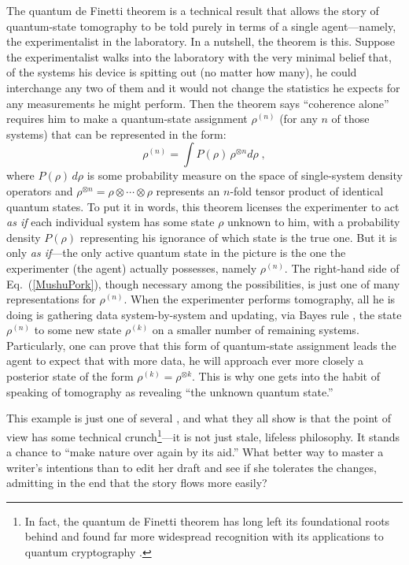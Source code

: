 The quantum de Finetti theorem is a technical result that allows the story of quantum-state tomography to be told purely in terms of a single agent---namely, the experimentalist in the laboratory.  In a nutshell, the theorem is this.  Suppose the experimentalist walks into the laboratory with the very minimal belief that, of the systems his device is spitting out (no matter how many), he could interchange any two of them and it would not change the statistics he expects for any measurements he might perform.  Then the theorem says ``coherence alone'' requires him to make a quantum-state assignment $\rho^{(n)}$ (for any $n$ of those systems) that can be represented in the form:
\begin{equation}
\rho^{(n)}=\int P(\rho)\, \rho^{\otimes n} d\rho\;,
\label{MushuPork}
\end{equation}
where $P(\rho)\, d\rho$ is some probability measure on the space of single-system density operators and $\rho^{\otimes n}=\rho\otimes\cdots\otimes\rho$ represents an $n$-fold tensor product of identical quantum states. To put it in words, this theorem licenses the experimenter to act {\it as if\/} each individual system has some state $\rho$ unknown to him, with a probability density $P(\rho)$ representing his ignorance of which state is the true one.  But it is only {\it as if}---the only active quantum state in the picture is the one the experimenter (the agent) actually possesses, namely $\rho^{(n)}$.  The right-hand side of Eq.~(\ref{MushuPork}), though necessary among the possibilities, is just one of many representations for $\rho^{(n)}$.  When the experimenter performs tomography, all he is doing is gathering data system-by-system and updating, via Bayes rule \cite{Schack01}, the state $\rho^{(n)}$ to some new state $\rho^{(k)}$ on a smaller number of remaining systems. Particularly, one can prove that this form of quantum-state assignment leads the agent to expect that with more data, he will approach ever more closely a posterior state of the form $\rho^{(k)}=\rho^{\otimes k}$.  This is why one gets into the habit of speaking of tomography as revealing ``the unknown quantum state.''

This example is just one of several \cite{Fuchs04,Caves02c,Appleby05,Leifer06}, and what they all show is that the point of view has some technical crunch\footnote{In fact, the quantum de Finetti theorem has long left its foundational roots behind and found far more widespread recognition with its applications to quantum cryptography \cite{Renner05}.}---it is not just stale, lifeless philosophy.  It stands a chance to ``make nature over again by its aid.''  What better way to master a writer's intentions than to edit her draft and see if she tolerates the changes, admitting in the end that the story flows more easily?

